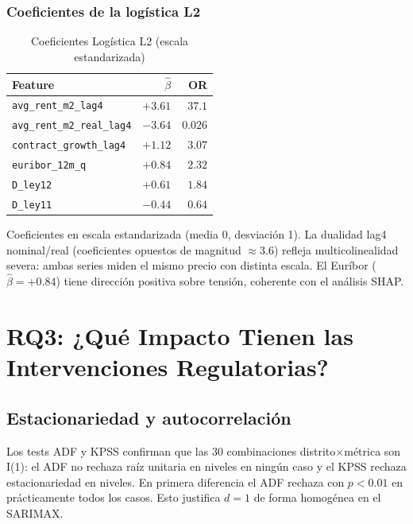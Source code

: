 \documentclass[10pt,a4paper,twocolumn]{article}
\begin{document}
\subsubsection{Coeficientes de la logística L2}

\begin{table}[!t]
\caption{Coeficientes Logística L2 (escala estandarizada)}
\label{tab:logit_coefs}
\centering\small
\begin{threeparttable}
\begin{tabular}{lrr}
\toprule
Feature & $\hat\beta$ & OR \\
\midrule
\texttt{avg\_rent\_m2\_lag4}     & $+3.61$ & $37.1$ \\
\texttt{avg\_rent\_m2\_real\_lag4} & $-3.64$ & $0.026$ \\
\texttt{contract\_growth\_lag4}  & $+1.12$ & $3.07$ \\
\texttt{euribor\_12m\_q}         & $+0.84$ & $2.32$ \\
\texttt{D\_ley12}                & $+0.61$ & $1.84$ \\
\texttt{D\_ley11}                & $-0.44$ & $0.64$ \\
\bottomrule
\end{tabular}
\begin{tablenotes}\small
\item Coeficientes en escala estandarizada (media 0, desviación 1). La dualidad
lag4 nominal/real (coeficientes opuestos de magnitud $\approx 3.6$) refleja
multicolinealidad severa: ambas series miden el mismo precio con distinta escala.
El Euríbor ($\hat\beta{=}+0.84$) tiene dirección positiva sobre tensión, coherente
con el análisis SHAP.
\end{tablenotes}
\end{threeparttable}
\end{table}

\section{RQ3: ¿Qué Impacto Tienen las Intervenciones Regulatorias?}
\label{sec:rq3}

\subsection{Estacionariedad y autocorrelación}

Los tests ADF y KPSS confirman que las 30 combinaciones distrito$\times$métrica
son I(1): el ADF no rechaza raíz unitaria en niveles en ningún caso y el KPSS
rechaza estacionariedad en niveles. En primera diferencia el ADF rechaza con
$p{<}0.01$ en prácticamente todos los casos. Esto justifica $d{=}1$ de forma
homogénea en el SARIMAX.
\end{document}
